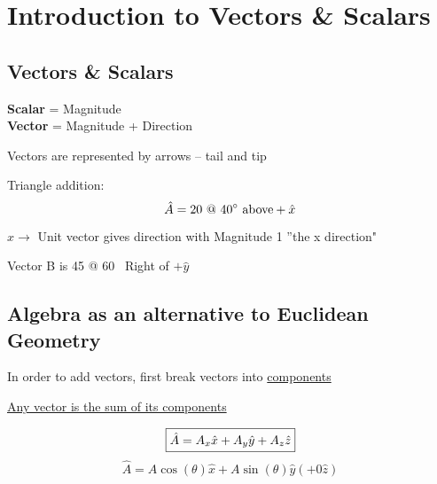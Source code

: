 \documentclass{article}
\begin{document}
\newpage
    \tableofcontents
\newpage

\section{Introduction to Vectors \& Scalars}

\subsection{Vectors \& Scalars}

\textbf{Scalar} = Magnitude \\
\textbf{Vector} = Magnitude + Direction

Vectors are represented by arrows – tail and tip


Triangle addition:
$$ \hat{A} = 20 \text{ @ } 40 \degree\ \text{above} +\hat{x} $$

$ \hat{x} \rightarrow $ Unit vector gives direction with Magnitude 1 ''the x direction"

Vector B is 45 @ 60 \degree\ Right of $ +\hat{y} $

\subsection{Algebra as an alternative to Euclidean Geometry}

In order to add vectors, first break vectors into \underline{components}


\underline{Any vector is the sum of its components}

\begin{equation}
    \boxed{\hat{A} = A_{x} \hat{x} + A_{y} \hat{y} + A_{z} \hat{z}} \\
\end{equation}
$$ \hat{A} = A \cos(\theta) \hat{x} + A \sin(\theta) \hat{y} \left( + 0 \hat{z} \right) $$

\end{document}
